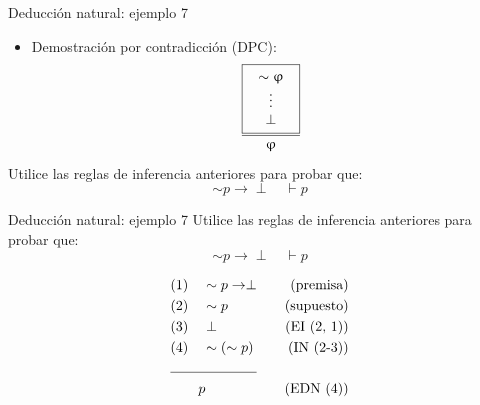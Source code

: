 \documentclass{beamer}
\begin{document}
\begin{frame}{Deducción natural: ejemplo 7}
  \begin{itemize}
    \item Demostración por contradicción (DPC):
          \begin{equation*}
            \frac{
              \fbox{
                $\begin{array}{c}
                  \sim \upvarphi \\
                  \vdots \\
                  \perp
                \end{array}$
              }
            }{\upvarphi}
          \end{equation*}
  \end{itemize}

  Utilice las reglas de inferencia anteriores para probar que:
  $$\sim p \rightarrow \perp \quad \vdash p$$
\end{frame}


\begin{frame}{Deducción natural: ejemplo 7}
  Utilice las reglas de inferencia anteriores para probar que:
  $$\sim p \rightarrow \perp \quad \vdash p$$

  \begin{align*}
    &(1) \quad \sim p \rightarrow \perp  & \quad (\text{premisa}) \\
    &(2) \quad \sim p  & \quad (\text{supuesto}) \\
    &(3) \quad \perp  & \quad (\text{EI (2, 1)}) \\
    &(4) \quad \sim (\sim p)  & \quad (\text{IN (2-3)}) \\
    \cline{1-2}
    & \qquad p & \quad (\text{EDN (4)})
  \end{align*}

\end{frame}
\end{document}
